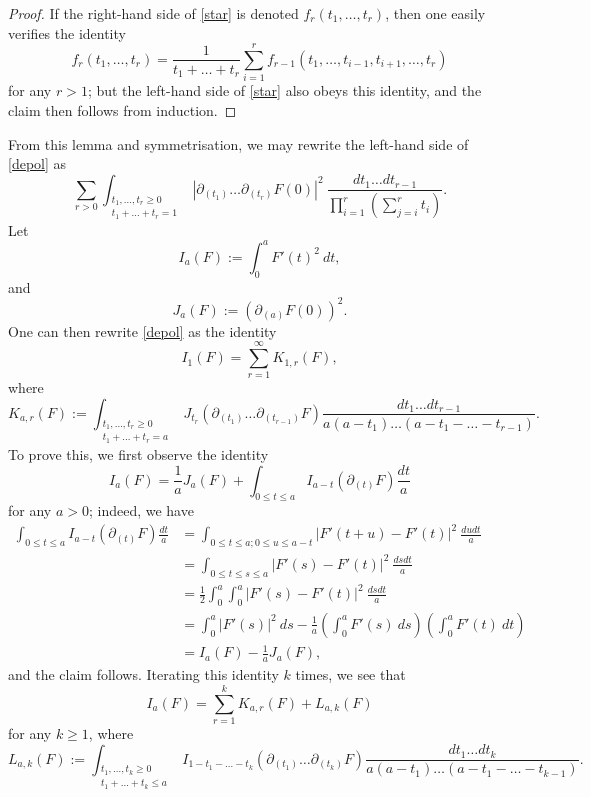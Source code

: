 \begin{proof}  If the right-hand side of \eqref{star} is denoted $f_r( t_1,\dots,t_r )$, then one easily verifies the identity
$$ f_r(t_1,\dots,t_r) = \frac{1}{t_1+\dots+t_r} \sum_{i=1}^r f_{r-1}(t_1,\dots,t_{i-1},t_{i+1},\dots,t_r)$$
for any $r > 1$; but the left-hand side of \eqref{star} also obeys this identity, and the claim then follows from induction.
\end{proof}

From this lemma and symmetrisation, we may rewrite the left-hand side of \eqref{depol} as
$$
 \sum_{r>0} \int_{\substack{t_1,\dots,t_r \geq 0\\ t_1+\dots+t_r =1}} |\partial_{(t_1)} \dots \partial_{(t_r)} F(0)|^2\ \frac{dt_1 \dots dt_{r-1}}{\prod_{i=1}^r(\sum_{j=i}^rt_i)}.$$
Let
$$ I_a(F) := \int_0^a F'(t)^2\ dt,$$
and
$$ J_a(F) := (\partial_{(a)} F(0))^2.$$
One can then rewrite \eqref{depol} as the identity
\begin{equation}\label{depol-2}
 I_1(F) = \sum_{r=1}^\infty K_{1,r}(F),
\end{equation}
where
$$ K_{a,r}(F) := \int_{\substack{t_1,\dots,t_r \geq 0\\ t_1+\dots+t_r =a}} J_{t_r}( \partial_{(t_1)} \dots \partial_{(t_{r-1})} F) \frac{dt_1 \dots dt_{r-1}}{a(a-t_1) \dots (a-t_1-\dots-t_{r-1})}.$$
To prove this, we first observe the identity
$$ I_a(F) = \frac{1}{a} J_a(F) + \int_{0 \leq t \leq a} I_{a-t}( \partial_{(t)} F ) \frac{dt}{a}$$
for any $a>0$; indeed, we have
\begin{align*}
\int_{0 \leq t \leq a} I_{a-t}( \partial_{(t)} F ) \frac{dt}{a} &=
\int_{0 \leq t \leq a; 0 \leq u \leq a-t} |F'(t+u) - F'(t)|^2\ \frac{du dt}{a} \\
&= \int_{0 \leq t \leq s \leq a} |F'(s) - F'(t)|^2\ \frac{ds dt}{a} \\
&= \frac{1}{2} \int_0^a \int_0^a |F'(s) - F'(t)|^2\ \frac{ds dt}{a} \\
&= \int_0^a |F'(s)|^2\ ds - \frac{1}{a} \left(\int_0^a F'(s)\ ds\right) \left(\int_0^a F'(t)\ dt\right) \\
&= I_a(F) - \frac{1}{a} J_a(F),
\end{align*}
and the claim follows.  Iterating this identity $k$ times, we see that
\begin{equation}\label{iak}
I_a(F) = \sum_{r=1}^k K_{a,r}(F) + L_{a,k}(F)
\end{equation}
for any $k \geq 1$, where
$$ L_{a,k}(F) := \int_{\substack{t_1,\dots,t_k \geq 0\\ t_1+\dots+t_k \leq a}} I_{1-t_1-\dots-t_k}( \partial_{(t_1)} \dots \partial_{(t_k)} F) \frac{dt_1 \dots dt_k}{a(a-t_1) \dots (a-t_1-\dots-t_{k-1})}.$$
